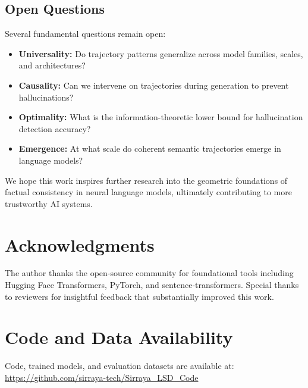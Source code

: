 \documentclass[11pt]{article}
\begin{document}
\subsection{Open Questions}

Several fundamental questions remain open:
\begin{itemize}[leftmargin=*]
    \item \textbf{Universality:} Do trajectory patterns generalize across model families, scales, and architectures?
    \item \textbf{Causality:} Can we intervene on trajectories during generation to prevent hallucinations?
    \item \textbf{Optimality:} What is the information-theoretic lower bound for hallucination detection accuracy?
    \item \textbf{Emergence:} At what scale do coherent semantic trajectories emerge in language models?
\end{itemize}

We hope this work inspires further research into the geometric foundations of factual consistency in neural language models, ultimately contributing to more trustworthy AI systems.



\section*{Acknowledgments}

The author thanks the open-source community for foundational tools including Hugging Face Transformers, PyTorch, and sentence-transformers. Special thanks to reviewers for insightful feedback that substantially improved this work.

\section*{Code and Data Availability}

Code, trained models, and evaluation datasets are available at: \url{https://github.com/sirraya-tech/Sirraya_LSD_Code}
\end{document}
